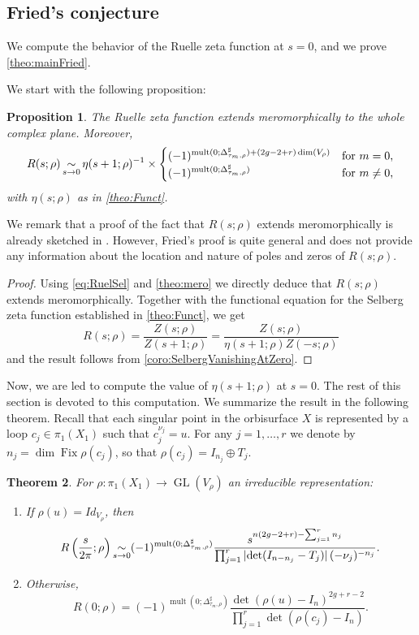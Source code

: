 \documentclass[JEP,XML,SOM,Unicode,NoFloatCountersInSection,published]{cedram}
\newcommand{\simm}{\mathop{\sim}\displaylimits}
\theoremstyle{plain}
\newtheorem{thm}{Theorem}[subsection]
\newtheorem{prop}[thm]{Proposition}
\theoremstyle{definition}
\theoremstyle{remark}
\DeclareMathOperator{\GL}{GL}
\DeclareMathOperator{\Fix}{Fix}
\numberwithin{equation}{section}
\DeclareMathOperator{\mult}{mult}
\begin{document}
\subsection{Fried's conjecture}
\label{subsec:Fried}
We compute the behavior of the Ruelle zeta function at $s=0$, and we prove \cref{theo:mainFried}.


We start with the following proposition:
\begin{prop}\label{prop:RuelleVsEtaAtZero}
The Ruelle zeta function extends meromorphically to the whole complex plane. Moreover,
\[
R(s; \rho) \simm_{s \to 0} \eta(s+1;\rho)^{-1}\times\begin{cases}(-1)^{\mult(0;\Delta_{\tau_m,\rho}^\sharp)+(2g-2+r)\dim(V_\rho)}&\mbox{for $m=0$,}\\(-1)^{\mult(0;\Delta_{\tau_m,\rho}^\sharp)}&\mbox{for $m\neq0$,}\end{cases}
\]
with $\eta(s;\rho)$ as in \cref{theo:Funct}.
\end{prop}

We remark that a proof of the fact that $R(s;\rho)$ extends meromorphically is already sketched in \cite[Th.\,1]{fried1986fuchsian}. However, Fried's proof is quite general and does not provide any information about the location and nature of poles and zeros of $R(s;\rho)$.

\begin{proof}
Using \cref{eq:RuelSel} and \cref{theo:mero} we directly deduce that $R(s; \rho)$ extends meromorphically. Together with the functional equation for the Selberg zeta function established in \cref{theo:Funct}, we get
\[
R(s; \rho) = \frac{Z(s;\rho)}{Z(s+1;\rho)} = \frac{Z(s;\rho)}{\eta(s+1;\rho) Z(-s;\rho)}
\]
and the result follows from \cref{coro:SelbergVanishingAtZero}.
\end{proof}

Now, we are led to compute the value of $\eta(s+1;\rho)$ at $s=0$. The rest of this section is devoted to this computation. We summarize the result in the following theorem. Recall that each singular point in the orbisurface $X$ is represented by a loop $c_j \in \pi_1(X_1)$ such that $c_j^{\nu_j} = u$.
For any $j=1, \ldots, r$ we denote by $n_j= \dim \Fix \rho(c_j)$, so that $\rho(c_j) = I_{n_j} \oplus T_j$.

\begin{thm}
\label{theo:Ruelle0}
For $\rho\colon \pi_1(X_1) \to \GL(V_\rho)$ an irreducible representation:
\begin{enumerate}
\item \label{item1}
If $\rho(u)= Id_{V_\rho}$, then\vspace*{-3pt}
\[
R\left(\frac{s}{2\pi}; \rho\right) \simm_{s \to 0} (-1)^{\mult(0;\Delta_{\tau_m,\rho}^\sharp)}\frac{s^{n(2g-2+r)-\sum_{j=1}^rn_j}}{\prod_{j=1}^r |{\det}(I_{n-n_j} -T_j)|\,(-\nu_j)^{-n_j}}.
\]
\item \label{item2}
Otherwise,\vspace*{-3pt}
\[
R(0;\rho) = (-1)^{\mult(0;\Delta_{\tau_m,\rho}^\sharp)}\frac{\det(\rho(u)-I_n)^{2g+r-2}}{\prod_{j=1}^r \det(\rho(c_j)-I_n)}.
\]
\end{enumerate}
\end{thm}
\end{document}
